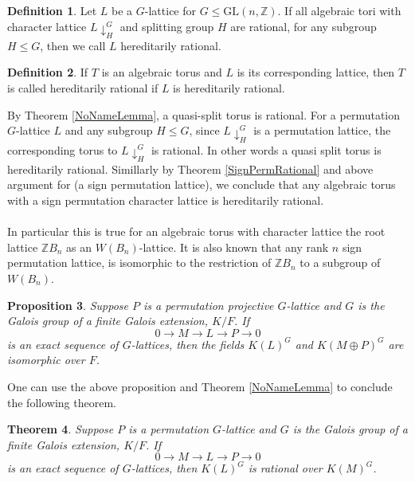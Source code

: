 \documentclass{article}
\theoremstyle{plain}
\newtheorem{theorem}{Theorem}
\newtheorem{proposition}[theorem]{Proposition}
\theoremstyle{definition}
\newtheorem{definition}[theorem]{Definition}
\newcommand{\Z}{\ensuremath{\mathbb{Z}}}
\begin{document}
\begin{definition}
Let $L$ be a $G$-lattice for $G\leq \mathrm{GL}(n,\Z)$. If all algebraic tori with character lattice $L\downarrow_H^G$ and splitting group $H$ are rational, for any subgroup $H \leq G$, then we call $L$ hereditarily rational. 
\end{definition} 
\begin{definition}
If $T$ is an algebraic torus and $L$ is its corresponding lattice, then $T$ is called hereditarily rational if $L$ is hereditarily rational.
\end{definition}
\noindent
By Theorem \ref{NoNameLemma}, a quasi-split torus is rational. For a permutation $G$-lattice $L$ and any subgroup $H\leq G$, since $L\downarrow_H^G$ is a permutation lattice, the corresponding torus to $L\downarrow_H^G$ is rational. In other words a quasi split torus is hereditarily rational. Simillarly by Theorem \ref{SignPermRational} and above argument for (a sign permutation lattice), we conclude that any algebraic torus with a sign permutation character lattice is hereditarily rational. \\ \\
In particular this is true for an algebraic torus with character lattice the root lattice $\Z B_n$ as an $W(B_n)$-lattice. It is also known that any rank $n$ sign permutation lattice, is isomorphic to the restriction of $\Z B_n$ to a subgroup of $W(B_n)$. 
\begin{proposition}\cite[Proposition 1.5]{Lenstra}
Suppose $P$ is a permutation projective $G$-lattice and $G$ is the Galois group of a finite Galois extension, $K/F$. If $$0 \longrightarrow M \longrightarrow L \longrightarrow P \longrightarrow 0 $$ is an exact sequence of $G$-lattices, then the fields $K(L)^G$ and $K(M \oplus P)^G$ are isomorphic over $F$. 
\end{proposition}
\noindent
One can use the above proposition and Theorem \ref{NoNameLemma} to conclude the following theorem.
\begin{theorem}\cite[Proposition 1.6]{Lenstra}\label{method2}
Suppose $P$ is a permutation $G$-lattice and $G$ is the Galois group of a finite Galois extension, $K/F$.  If $$0 \longrightarrow M \longrightarrow L \longrightarrow P \longrightarrow 0 $$ is an exact sequence of $G$-lattices, then $K(L)^G$ is rational over $K(M)^G$.
\end{theorem}
\end{document}
